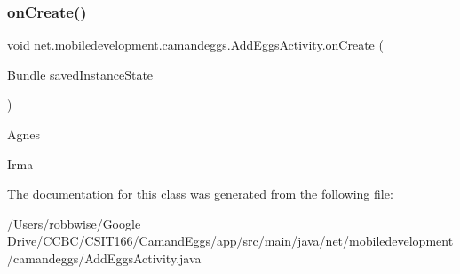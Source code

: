 \subsubsection{\texorpdfstring{on\+Create()}{onCreate()}}
{\footnotesize\ttfamily void net.\+mobiledevelopment.\+camandeggs.\+Add\+Eggs\+Activity.\+on\+Create (\begin{DoxyParamCaption}\item[{Bundle}]{saved\+Instance\+State }\end{DoxyParamCaption})\hspace{0.3cm}{\ttfamily [protected]}}

Agnes

Irma

The documentation for this class was generated from the following file\+:\begin{DoxyCompactItemize}
\item 
/\+Users/robbwise/\+Google Drive/\+C\+C\+B\+C/\+C\+S\+I\+T166/\+Camand\+Eggs/app/src/main/java/net/mobiledevelopment/camandeggs/Add\+Eggs\+Activity.\+java\end{DoxyCompactItemize}
